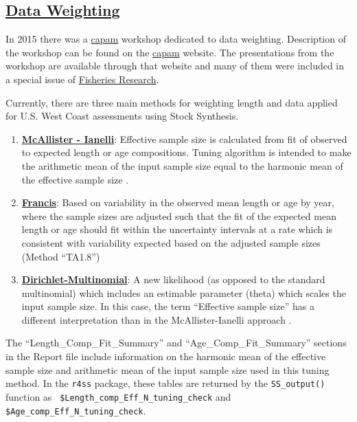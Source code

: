 \hypertarget{DataWeight}{}
\subsection[Data Weighting]{\protect\hyperlink{DataWeight}{Data Weighting}}\label{sec:DataWeight}


In 2015 there was a \href{https://www.capamresearch.org/}{\gls{capam}} workshop dedicated to data weighting. Description of the workshop can be found on the \href{http://capamresearch.org/data-weighting/workshop}{\gls{capam}} website. The presentations from the workshop are available through that website and many of them were included in a special issue of \href{https://sciencedirect.com/journal/fisheries-research/vol/192}{Fisheries Research}.

Currently, there are three main methods for weighting length and data applied for U.S. West Coast assessments using Stock Synthesis.

\begin{enumerate}
	\item \hyperlink{MI}{\textbf{McAllister - Ianelli}}: Effective sample size is calculated from fit of observed to expected length or age compositions. Tuning algorithm is intended to make the arithmetic mean of the input sample size equal to the harmonic mean of the effective sample size \citep{mcallister-bayesian-1997}.
	
	\item \hyperlink{Francis}{\textbf{Francis}}: Based on variability in the observed mean length or age by year, where the sample sizes are adjusted such that the fit of the expected mean length or age should fit within the uncertainty intervals at a rate which is consistent with variability expected based on the adjusted sample sizes (Method ``TA1.8'') \citep{francis-data-2011}
	
	\item \hyperlink{DM}{\textbf{Dirichlet-Multinomial}}: A new likelihood (as opposed to the standard multinomial) which includes an estimable parameter (theta) which scales the input sample size. In this case, the term ``Effective sample size'' has a different interpretation than in the McAllister-Ianelli approach \citep{thorson-model-based-2017}.
\end{enumerate}


\hypertarget{MI}{}
The ``Length\_Comp\_Fit\_Summary'' and ``Age\_Comp\_Fit\_Summary'' sections in the Report file include information on the harmonic mean of the effective sample size and arithmetic mean of the input sample size used in this tuning method. In the \texttt{r4ss} package, these tables are returned by the \texttt{SS\_output()} function as \texttt{ \$Length\_comp\_Eff\_N\_tuning\_check} and \texttt{ \$Age\_comp\_Eff\_N\_tuning\_check}.

